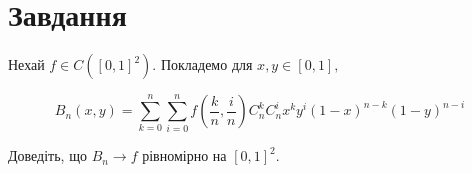 
\chapter{Завдання \theHchapter}

\begin{tcolorbox}[title=Завдання]
    Нехай $f \in C([0, 1]^2)$. Покладемо для $x, y \in[0,1],$ 

    $$ B_n(x, y)=\sum_{k=0}^n \sum_{i=0}^n f(\frac{k}{n}, \frac{i}{n}) 
    C_n^k C_n^i x^k y^i(1-x)^{n-k}(1-y)^{n-i} $$

    Доведіть, що $B_n \rightarrow f$ рівномірно на $[0,1]^2$.
\end{tcolorbox}

